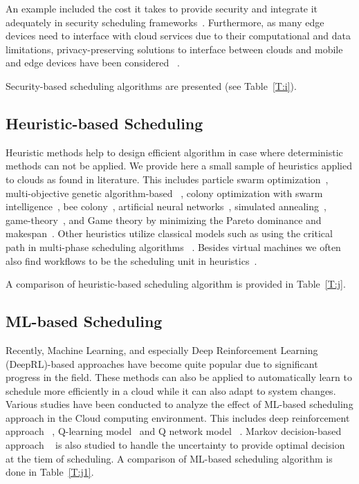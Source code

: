 \documentclass[final,5p,times,twocolumn]{elsarticle}
\begin{document}
An example included the cost it takes to provide security and
integrate it adequately in security scheduling
frameworks~\cite{kashyap2014security,zeng2015saba,wang2012cloud}.
Furthermore, as many edge devices need to interface with cloud
services due to their computational and data limitations,
privacy-preserving solutions to interface between clouds and mobile
and edge devices have been considered ~\cite{bilogrevic2011meetings}.

Security-based scheduling algorithms are presented (see
Table~\ref{T:i}). 



%

\subsection{Heuristic-based Scheduling}\label{sec:heuristic}


Heuristic methods help to design efficient algorithm in case where
deterministic methods can not be applied. We provide here a small
sample of heuristics applied to clouds as found in literature. This
includes particle swarm optimization~\cite{pandey2010particle},
multi-objective genetic algorithm-based
~\cite{mezmaz2011parallel,gkasior2016metaheuristic}, colony
optimization with swarm intelligence~\cite{mateos2013aco}, bee
colony~\cite{ld2013honey}, artificial neural
networks~\cite{kousiouris2011effects}, simulated
annealing~\cite{torabzadeh2010cloud},
game-theory~\cite{gkasior2016metaheuristic}, and Game theory by
minimizing the Pareto dominance and makespan~\cite{su2013cost}.  Other
heuristics utilize classical models such as using the critical path in
multi-phase scheduling algorithms ~\cite
{abrishami2013deadline}. Besides virtual machines we often also find
workflows to be the scheduling unit in
heuristics~\cite{bousselmi2016qos}.

A comparison of heuristic-based scheduling
algorithm is provided in  Table~\ref{T:j}.

%


\subsection{ML-based Scheduling}\label{sec:AI}

Recently, Machine Learning, and especially Deep Reinforcement Learning
(DeepRL)-based approaches have become quite popular due to significant
progress in the field. These methods can also be applied to
automatically learn to schedule more efficiently in a cloud while it
can also adapt to system changes. Various studies have been conducted
to analyze the effect of ML-based scheduling approach in the Cloud
computing environment. This includes deep reinforcement approach
~\cite{cheng2018drl,mao2018learning}, Q-learning
model~\cite{zhang2017energy} and Q network model
~\cite{wang2019multi}. Markov decision-based approach
~\cite{barrett2013applying} is also studied to handle the uncertainty
to provide optimal decision at the tiem of scheduling.  A comparison
of ML-based scheduling algorithm is done in Table~\ref{T:j1}.
\end{document}
